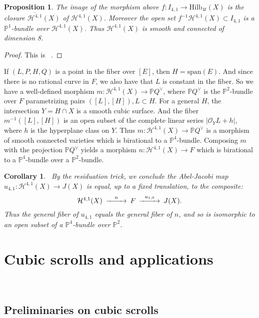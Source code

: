 \documentclass[amssymb,twoside,12 pt,amscd,reqno]{amsart}
\theoremstyle{plain}
\newtheorem{cor}[thm]{Corollary}
\newtheorem{prop}[thm]{Proposition}
\theoremstyle{definition}
\newcommand{\Hdg}[2]{\mathcal{H}^{#1,#2}}
\newcommand{\PP}{\mathbb{P}}
\newcommand{\HI}[2]{\text{Hilb}_{#1}(#2)}
\newcommand{\OO}{\mathcal O}
\begin{document}
\begin{prop}\label{lem-qell}  The image of the morphism above
$f:I_{4,1}\rightarrow\HI{4t}{X}$ is the closure $\overline{\Hdg{4}{1}}(X)$ 
of $\Hdg{4}{1}(X)$.  Moreover the open set $f^{-1}\Hdg{4}{1}(X)\subset 
I_{4,1}$ is a $\PP^1$-bundle over $\Hdg{4}{1}(X)$.  Thus $\Hdg{4}{1}(X)$ is
smooth and connected of dimension 8.
\end{prop}

\begin{proof}
This is ~\cite[proposition 5.1]{HRS1}.
\end{proof}

If $(L,P,H,Q)$ is a point in the fiber over $[E]$, then
$H=\text{span}(E)$.  And since there is no rational curve in $F$, we
also have that $L$ is constant in the fiber.
So we have a well-defined morphism $m:\Hdg{4}{1}(X)\rightarrow \PP
Q^\vee$, where $\PP Q^\vee$ is the $\PP^2$-bundle over $F$ parametrizing pairs
$([L],[H]), L\subset H$.  For a general $H$, the intersection $Y=H\cap X$ is
a smooth cubic surface.  And the fiber $m^{-1}([L],[H])$ is an open
subset of the complete linear series $|\OO_Y{L+h}|$, where $h$ is the
hyperplane class on $Y$.  Thus $m:\Hdg{4}{1}(X)\rightarrow \PP Q^\vee$
is a morphism of smooth connected varieties which is birational to a
$\PP^4$-bundle.  Composing $m$ with the projection $\PP Q^\vee$ yields
a morphism $n:\Hdg{4}{1}(X)\rightarrow F$ which is birational to a
$\PP^4$-bundle over a $\PP^2$-bundle.  

\begin{cor}~\label{cor-qell}
By the residuation trick, we conclude 
the Abel-Jacobi map
$u_{4,1}:\Hdg{4}{1}(X)\rightarrow J(X)$ is equal, up to a
fixed translation, to the composite:
\begin{equation}\begin{CD}
\Hdg{4}{1}(X) @> n >> F @> u_{1,0} >> J(X).
\end{CD}\end{equation}
Thus the general fiber of $u_{4,1}$ equals the general fiber
of $n$, and so is isomorphic to an open subset of a $\PP^4$-bundle
over $\PP^2$.  
\end{cor}

\section{Cubic scrolls and applications}~\label{sec-cuscr}

\subsection{Preliminaries on cubic scrolls}~\label{subsec-prelim}
\end{document}

